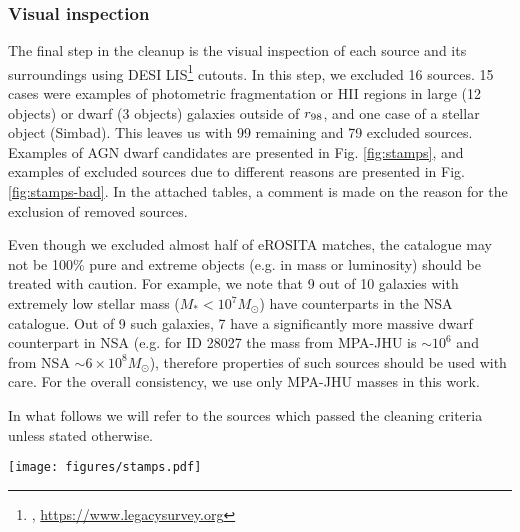 \documentclass[fleqn,usenatbib]{mnras}
\newcommand{\msun}{M_\odot}
\begin{document}
\subsubsection*{Visual inspection}


The final step in the cleanup is the visual inspection of each source and its surroundings using DESI LIS\footnote{\citealt{Dey2019}, \url{https://www.legacysurvey.org}} cutouts. In this step, we excluded 16 sources. 15 cases were examples of photometric fragmentation or HII regions in large  (12 objects) or dwarf (3 objects) galaxies outside of $r_{\rm 98}$, and one case of a stellar object (Simbad). This leaves us with 99 remaining  and 79 excluded sources. Examples of AGN dwarf candidates are presented in Fig. \ref{fig:stamps}, and examples of excluded sources due to different reasons are presented in Fig. \ref{fig:stamps-bad}. In the attached tables, a comment is made on the reason for the exclusion of removed sources. 


Even though we excluded almost half of eROSITA matches, the catalogue may not be 100\% pure and extreme objects (e.g. in mass or luminosity) should be treated with caution. For example, we note that 9 out of 10  galaxies with extremely low stellar mass ($M_*<10^7\msun$) have counterparts in the NSA catalogue. Out of 9 such galaxies, 7 have a significantly more massive dwarf counterpart in NSA (e.g. for ID 28027 the mass from MPA-JHU is $\sim10^6$ and from NSA $\sim6\times10^8\msun$), therefore properties of such sources should be used with care.  For the overall consistency, we use only MPA-JHU masses in this work.

In what follows we will refer to the sources which passed the cleaning criteria unless stated otherwise.



\begin{figure*}
    \centering
    \texttt{[image: figures/stamps.pdf]}
    \caption[Examples of dwarf galaxies with X-ray activity detected by eROSITA.]{Examples of galaxies which passed the selection criteria. Each image is a DESI LIS cutout centred on the dwarf's position. eROSITA X-ray source position and positional uncertainty ($r_{98}$) shown as cyan circle. Each galaxy has an ID on the bottom left and the scale bar on the bottom right (20" in length).}
    \label{fig:stamps}
\end{figure*}
\end{document}
